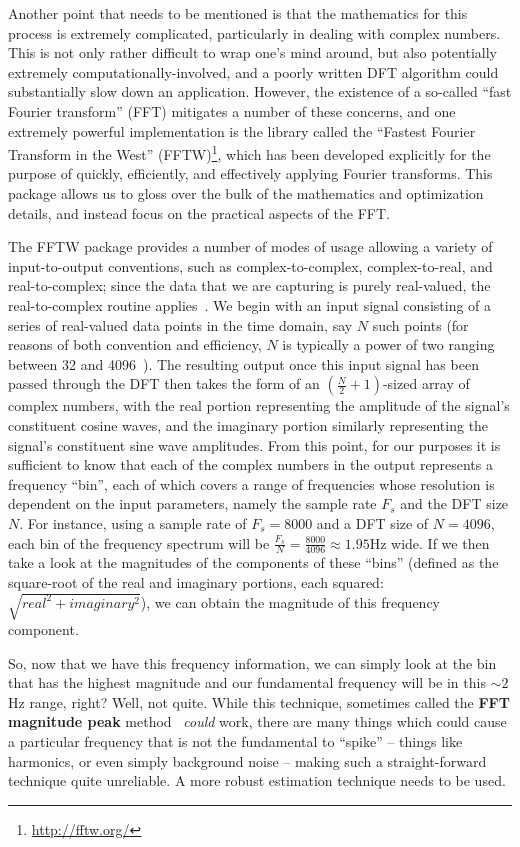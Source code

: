 \documentclass[12pt]{report}
\begin{document}
\indent Another point that needs to be mentioned is that the mathematics for this process is extremely complicated, particularly in dealing with complex numbers. This is not only rather difficult to wrap one's mind around, but also potentially extremely computationally-involved, and a poorly written DFT algorithm could substantially slow down an application. However, the existence of a so-called ``fast Fourier transform'' (FFT) mitigates a number of these concerns, and one extremely powerful implementation is the library called the ``Fastest Fourier Transform in the West'' (FFTW)\footnote{\url{http://fftw.org/}}, which has been developed explicitly for the purpose of quickly, efficiently, and effectively applying Fourier transforms. This package allows us to gloss over the bulk of the mathematics and optimization details, and instead focus on the practical aspects of the FFT. 

\indent The FFTW package provides a number of modes of usage allowing a variety of input-to-output conventions, such as complex-to-complex, complex-to-real, and real-to-complex; since the data that we are capturing is purely real-valued, the real-to-complex routine applies~\cite{Frigo2005}. We begin with an input signal consisting of a series of real-valued data points in the time domain, say $N$ such points (for reasons of both convention and efficiency, $N$ is typically a power of two ranging between 32 and 4096~\cite[ch. 8.1]{Smith1998}). The resulting output once this input signal has been passed through the DFT then takes the form of an $(\frac{N}{2} + 1)$-sized array of complex numbers, with the real portion representing the amplitude of the signal's constituent cosine waves, and the imaginary portion similarly representing the signal's constituent sine wave amplitudes. From this point, for our purposes it is sufficient to know that each of the complex numbers in the output represents a frequency ``bin'', each of which covers a range of frequencies whose resolution is dependent on the input parameters, namely the sample rate $F_s$ and the DFT size $N$. For instance, using a sample rate of $F_s = 8000$ and a DFT size of $N = 4096$, each bin of the frequency spectrum will be $\frac{F_s}{N} = \frac{8000}{4096} \approx 1.95$Hz wide. If we then take a look at the magnitudes of the components of these ``bins'' (defined as the square-root of the real and imaginary portions, each squared: $\sqrt{real^2 + imaginary^2}$), we can obtain the magnitude of this frequency component.

\indent So, now that we have this frequency information, we can simply look at the bin that has the highest magnitude and our fundamental frequency will be in this $\sim2$Hz range, right? Well, not quite. While this technique, sometimes called the {\bf FFT magnitude peak} method~\cite{Nicholson2011} \emph{could} work, there are many things which could cause a particular frequency that is not the fundamental to ``spike'' -- things like harmonics, or even simply background noise -- making such a straight-forward technique quite unreliable. A more robust estimation technique needs to be used.
\end{document}
